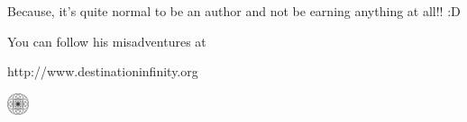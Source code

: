 \documentclass[
    coverheight=148mm, coverwidth=105mm, spinewidth=10mm,
    bleedwidth=31mm,
    foldingmargin=true, 12pt
]{bookcover}
\begin{document}
\begin{bookcover}
{        Because, it's quite normal to be an author and not be earning anything at all!!
        :D

        You can follow his misadventures at

        \centerline{http://www.destinationinfinity.org}

        \vfill

        \begin{center}
            \includegraphics[width=18pt]{logo.pdf}
        \end{center}
    }
\end{bookcover}
\end{document}
